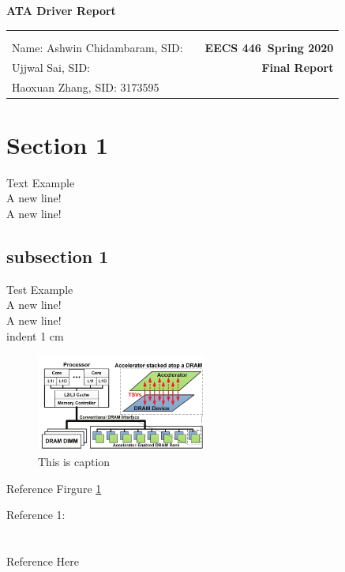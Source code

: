 \documentclass[11pt]{article}
\makeatletter
\newcommand{\course}{EECS 446}
\newcommand{\semester}{Spring 2020}
\newcommand{\hwk}{Final Report}
\newcommand{\reportname}{ATA Driver Report}
\renewcommand\maketitle{
\begin{center}
  {\huge\bf\reportname}\\
\begin{tabular*}{6.44in}{l @{\extracolsep{\fill}}c r}
\bfseries   &   &  \bfseries \\
\bfseries   &   &  \bfseries \\
Name: Ashwin Chidambaram, SID:\bfseries  &  & \bfseries \course ~\semester\\
\-\hspace{1.15cm} Ujjwal Sai, SID: \bfseries&  & \bfseries  \hwk \\
\-\hspace{1.15cm} Haoxuan Zhang, SID: 3173595
\end{tabular*}
\end{center} }
\makeatother
\begin{document}
\maketitle
{}

\section{Section 1 \\}
Text Example \\
A new line!\\

A new line!

\subsection{subsection 1 \\}
Test Example \\
A new line!\\

A new line!\\
\-\hspace{1cm} indent 1 cm

\begin{figure}[h!]
  \center
  \includegraphics[width=0.5\textwidth]{./Figure/NDA.png}
  \caption{This is caption}
  \label{any_name}
\end{figure}

Reference Firgure \ref{any_name} %

Reference 1: \cite{Ref1}



\section{}

\section{}
\newpage
\begin{thebibliography}{9}
Reference Here

\end{thebibliography}
\end{document}
